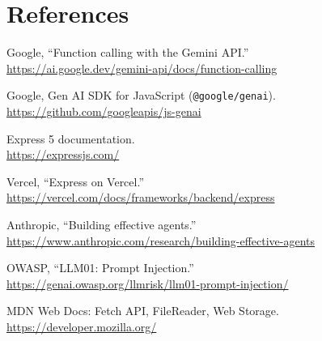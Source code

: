 \documentclass[11pt]{article}
\begin{document}
\section*{References}
\small\raggedright
\begin{enumerate}[label={[\arabic*]}]
  \item Google, ``Function calling with the Gemini API.''\\ \url{https://ai.google.dev/gemini-api/docs/function-calling}
  \item Google, Gen AI SDK for JavaScript (\texttt{@google/genai}).\\ \url{https://github.com/googleapis/js-genai}
  \item Express 5 documentation.\\ \url{https://expressjs.com/}
  \item Vercel, ``Express on Vercel.''\\ \url{https://vercel.com/docs/frameworks/backend/express}
  \item Anthropic, ``Building effective agents.''\\ \url{https://www.anthropic.com/research/building-effective-agents}
  \item OWASP, ``LLM01: Prompt Injection.''\\ \url{https://genai.owasp.org/llmrisk/llm01-prompt-injection/}
  \item MDN Web Docs: Fetch API, FileReader, Web Storage.\\ \url{https://developer.mozilla.org/}
\end{enumerate}
\end{document}

